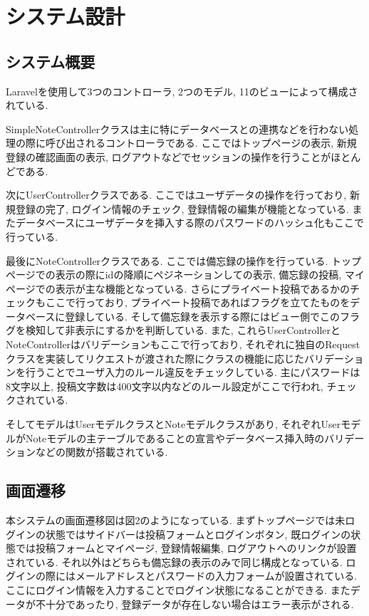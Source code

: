 \documentclass[submit,techrep]{ipsj}
\begin{document}
\section{システム設計}
\subsection{システム概要}
Laravelを使用して3つのコントローラ, 2つのモデル, 11のビューによって構成されている. 

SimpleNoteControllerクラスは主に特にデータベースとの連携などを行わない処理の際に呼び出されるコントローラである. 
ここではトップページの表示, 新規登録の確認画面の表示, ログアウトなどでセッションの操作を行うことがほとんどである. 

次にUserControllerクラスである. ここではユーザデータの操作を行っており, 新規登録の完了, ログイン情報のチェック, 登録情報の編集が機能となっている. またデータベースにユーザデータを挿入する際のパスワードのハッシュ化もここで行っている. 

最後にNoteControllerクラスである. ここでは備忘録の操作を行っている. トップページでの表示の際にidの降順にペジネーションしての表示, 備忘録の投稿, マイページでの表示が主な機能となっている. さらにプライベート投稿であるかのチェックもここで行っており, プライベート投稿であればフラグを立てたものをデータベースに登録している. 
そして備忘録を表示する際にはビュー側でこのフラグを検知して非表示にするかを判断している. 
また, これらUserControllerとNoteControllerはバリデーションもここで行っており, それぞれに独自のRequestクラスを実装してリクエストが渡された際にクラスの機能に応じたバリデーションを行うことでユーザ入力のルール違反をチェックしている. 主にパスワードは8文字以上, 投稿文字数は400文字以内などのルール設定がここで行われ, チェックされている.

そしてモデルはUserモデルクラスとNoteモデルクラスがあり, それぞれUserモデルがNoteモデルの主テーブルであることの宣言やデータベース挿入時のバリデーションなどの関数が搭載されている. 

\subsection{画面遷移}
本システムの画面遷移図は図2のようになっている. まずトップページでは未ログインの状態ではサイドバーは投稿フォームとログインボタン, 既ログインの状態では投稿フォームとマイページ, 登録情報編集, ログアウトへのリンクが設置されている. それ以外はどちらも備忘録の表示のみで同じ構成となっている.
ログインの際にはメールアドレスとパスワードの入力フォームが設置されている. ここにログイン情報を入力することでログイン状態になることができる. またデータが不十分であったり, 登録データが存在しない場合はエラー表示がされる. 
\end{document}

